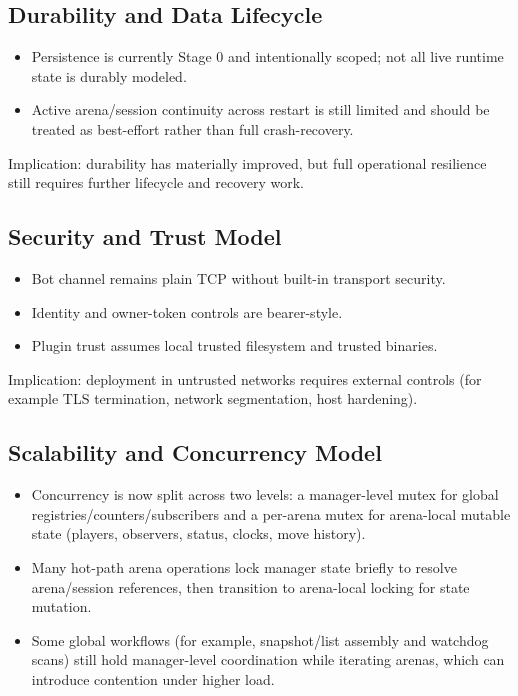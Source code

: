 \documentclass[11pt]{article}
\begin{document}
\subsection{Durability and Data Lifecycle}
\begin{itemize}[leftmargin=*]
  \item Persistence is currently Stage 0 and intentionally scoped; not all live runtime state is durably modeled.
  \item Active arena/session continuity across restart is still limited and should be treated as best-effort rather than full crash-recovery.
\end{itemize}

Implication: durability has materially improved, but full operational resilience still requires further lifecycle and recovery work.

\subsection{Security and Trust Model}
\begin{itemize}[leftmargin=*]
  \item Bot channel remains plain TCP without built-in transport security.
  \item Identity and owner-token controls are bearer-style.
  \item Plugin trust assumes local trusted filesystem and trusted binaries.
\end{itemize}

Implication: deployment in untrusted networks requires external controls (for example TLS termination, network segmentation, host hardening).

\subsection{Scalability and Concurrency Model}
\begin{itemize}[leftmargin=*]
  \item Concurrency is now split across two levels: a manager-level mutex for global registries/counters/subscribers and a per-arena mutex for arena-local mutable state (players, observers, status, clocks, move history).
  \item Many hot-path arena operations lock manager state briefly to resolve arena/session references, then transition to arena-local locking for state mutation.
  \item Some global workflows (for example, snapshot/list assembly and watchdog scans) still hold manager-level coordination while iterating arenas, which can introduce contention under higher load.
\end{itemize}
\end{document}

